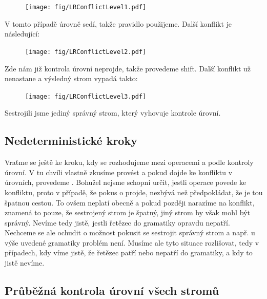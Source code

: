 \begin{exmp}
  \begin{figure}[H]
    \centering
    \texttt{[image: fig/LRConflictLevel1.pdf]}
  \end{figure}

  V tomto případě úrovně sedí, takže pravidlo použijeme.
  Další konflikt je následující:

  \begin{figure}[H]
    \centering
    \texttt{[image: fig/LRConflictLevel2.pdf]}
  \end{figure}

  Zde nám již kontrola úrovní neprojde, takže provedeme shift.
  Další konflikt už nenastane a výsledný strom vypadá takto:

  \begin{figure}[H]
    \centering
    \texttt{[image: fig/LRConflictLevel3.pdf]}
  \end{figure}

  Sestrojili jsme jediný správný strom, který vyhovuje kontrole úrovní.
\end{exmp}

\subsection{Nedeterministické kroky}
\label{subsec:nondetSteps}

Vraťme se ještě ke kroku, kdy se rozhodujeme mezi operacemi  a
 podle kontroly úrovní. V tu chvíli vlastně zkusíme provést
 a pokud dojde ke konfliktu v úrovních, provedeme .
Bohužel nejsme schopni určit, jestli operace  povede ke konfliktu,
proto v případě, že pokus o  projde, nezbývá než předpokládat, že
 je tou špatnou cestou.
To ovšem neplatí obecně a pokud později narazíme na konflikt, znamená to
pouze, že sestrojený strom je špatný, jiný strom by však mohl být správný.
Nevíme tedy jistě, jestli řetězec do gramatiky opravdu nepatří.\\

Nechceme se ale ochudit o možnost pokusit se sestrojit správný strom
a např. u výše uvedené gramatiky problém není.
Musíme ale tyto situace rozlišovat, tedy v případech, kdy víme jistě,
že řetězec patří nebo nepatří do gramatiky, a kdy to jistě nevíme.\\

\subsection{Průběžná kontrola úrovní všech stromů}
\label{subsec:contLevCheck}

